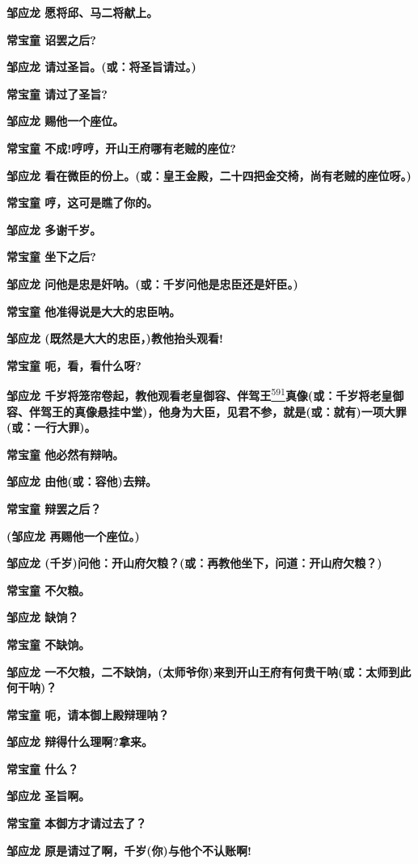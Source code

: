 \textbf{邹应龙 愿将邱、马二将献上。}

\textbf{常宝童 诏罢之后?}

\textbf{邹应龙 请过圣旨。(或：将圣旨请过。)}

\textbf{常宝童 请过了圣旨?}

\textbf{邹应龙 赐他一个座位。}

\textbf{常宝童 不成!哼哼，开山王府哪有老贼的座位?}

\textbf{邹应龙
看在微臣的份上。(或：皇王金殿，二十四把金交椅，尚有老贼的座位呀。)}

\textbf{常宝童 哼，这可是瞧了你的。}

\textbf{邹应龙 多谢千岁。}

\textbf{常宝童 坐下之后?}

\textbf{邹应龙 问他是忠是奸呐。(或：千岁问他是忠臣还是奸臣。)}

\textbf{常宝童 他准得说是大大的忠臣呐。}

\textbf{邹应龙 (既然是大大的忠臣，)教他抬头观看!}

\textbf{常宝童 呃，看，看什么呀?}

\textbf{邹应龙
千岁将笼帘卷起，教他观看老皇御容、伴驾王}\protect\hyperlink{fn591}{\textsuperscript{591}}\textbf{真像(或：千岁将老皇御容、伴驾王的真像悬挂中堂)，他身为大臣，见君不参，就是(或：就有)一项大罪(或：一行大罪)。}

\textbf{常宝童 他必然有辩呐。}

\textbf{邹应龙 由他(或：容他)去辩。}

\textbf{常宝童 辩罢之后？}

\textbf{(邹应龙 再赐他一个座位。)}

\textbf{邹应龙
(千岁)问他：开山府欠粮？(或：再教他坐下，问道：开山府欠粮？)}

\textbf{常宝童 不欠粮。}

\textbf{邹应龙 缺饷？}

\textbf{常宝童 不缺饷。}

\textbf{邹应龙
一不欠粮，二不缺饷，(太师爷你)来到开山王府有何贵干呐(或：太师到此何干呐)？}

\textbf{常宝童 呃，请本御上殿辩理呐？}

\textbf{邹应龙 辩得什么理啊?拿来。}

\textbf{常宝童 什么？}

\textbf{邹应龙 圣旨啊。}

\textbf{常宝童 本御方才请过去了？}

\textbf{邹应龙 原是请过了啊，千岁(你)与他个不认账啊!}


